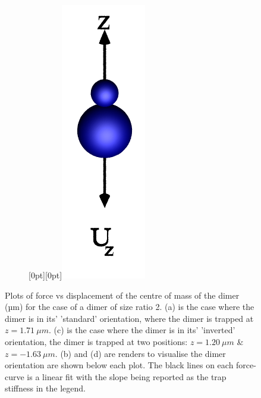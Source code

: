 \begin{figure}[h!]
\begin{subfigure}{.75\linewidth}
		\caption{}
		\label{lam=2_inverted}
	\end{subfigure}\hfill %
	\begin{subfigure}{.25\linewidth}
		\centering
		\raisebox{30pt}[0pt][0pt]{\makebox{}\includegraphics[width=0.3\linewidth, keepaspectratio]{theta=180.png}}
		\caption{}
		\label{small_over_large}
	\end{subfigure}
	\caption{Plots of force vs displacement of the centre of mass of 
		the dimer (µm) for the case of a dimer of size ratio 2. (a) is 
		the case where the dimer is in its' 'standard' orientation, where
		the dimer is trapped at $z = 1.71\ \mu m$. (c) is the case where 
		the dimer is in its' 'inverted' orientation, the dimer is trapped 
		at two positions: $z = 1.20\ \mu m$ \& $z=-1.63\ \mu m$. 
		(b) and (d) are renders to visualise the dimer orientation are shown 
		below each plot. The black lines on each force-curve is a linear 
		fit with the slope being reported as the trap stiffness in the legend.}
		\label{fig:paradigmatic}
\end{figure}

